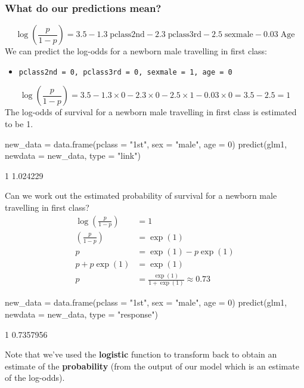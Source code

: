 \documentclass[a4paper]{article}
\begin{document}
\subsubsection{What do our predictions mean?}
\[
	\log\left(\frac{p}{1-p}\right) = 3.5 - 1.3\;\text{pclass2nd} - 2.3\;\text{pclass3rd} - 2.5\;\text{sexmale} - 0.03\;\text{Age}
\]
We can predict the log-odds for a newborn male travelling in first class:
\begin{itemize}
	\item \lstinline|pclass2nd = 0, pclass3rd = 0, sexmale = 1, age = 0|
\end{itemize}
\[
	\log\left(\frac{p}{1-p}\right) = 3.5 - 1.3\times 0 - 2.3\times 0 - 2.5\times 1 - 0.03\times 0 = 3.5 - 2.5 = 1
\]
The log-odds of survival for a newborn male travelling in first class is estimated to be 1.
\begin{Schunk}
\begin{Sinput}
new_data = data.frame(pclass = "1st", sex = "male", age = 0)
predict(glm1, newdata = new_data, type = "link")
\end{Sinput}
\begin{Soutput}
       1 
1.024229 
\end{Soutput}
\end{Schunk}
Can we work out the estimated probability of survival for a newborn male travelling in first class?
\begin{align*}
	\log\left(\frac{p}{1-p}\right) & = 1 \\
	\left(\frac{p}{1-p}\right) & = \exp(1) \\
	p & = \exp(1) - p\exp(1) \\
	p + p\exp(1) & = \exp(1) \\
	p & = \frac{\exp(1)}{1+\exp(1)} \approx 0.73
\end{align*}
\begin{Schunk}
\begin{Sinput}
new_data = data.frame(pclass = "1st", sex = "male", age = 0)
predict(glm1, newdata = new_data, type = "response")
\end{Sinput}
\begin{Soutput}
        1 
0.7357956 
\end{Soutput}
\end{Schunk}
Note that we've used the \textcolor{myred}{\textbf{logistic}} function to transform back to obtain an estimate of the \textbf{probability} (from the output of our model which is an estimate of the log-odds).
\end{document}

